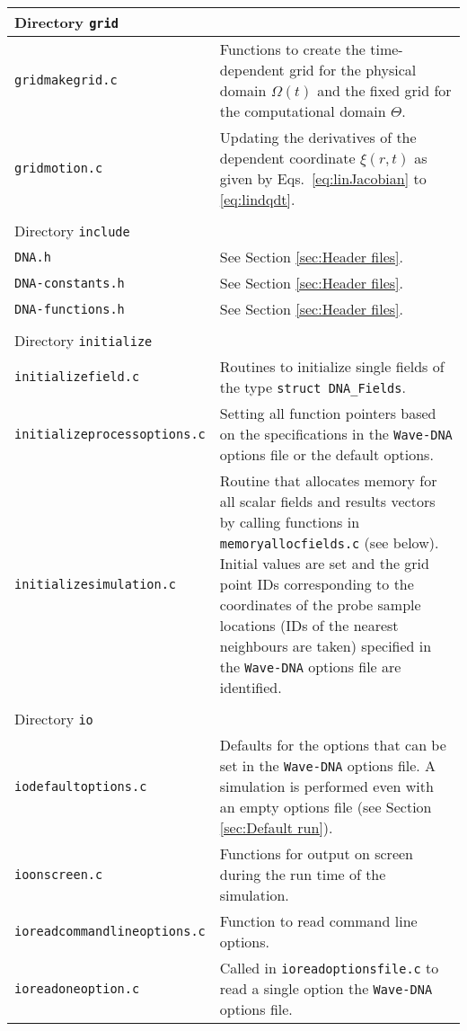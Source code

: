 \begin{longtable}{p{} p{}}
\\
\hline Directory {\tt grid} &\\ \hline
{\tt gridmakegrid.c} & Functions to create the time-dependent grid for the physical domain $\Omega\left(t\right)$ and the fixed grid for the computational domain $\Theta$. \\
{\tt gridmotion.c} & Updating the derivatives of the dependent coordinate $\xi\left(r,t\right)$ as given by Eqs.~\eqref{eq:linJacobian} to \eqref{eq:lindqdt}. \\
\\
\hline Directory {\tt include} &\\ \hline
{\tt DNA.h} & See Section \ref{sec:Header files}. \\
{\tt DNA-constants.h} & See Section \ref{sec:Header files}. \\
{\tt DNA-functions.h} & See Section \ref{sec:Header files}. \\
\\
\hline Directory {\tt initialize} &\\ \hline
{\tt initializefield.c} & Routines to initialize single fields of the type {\tt struct DNA\_Fields}. \\
{\tt initializeprocessoptions.c} & Setting all function pointers based on the specifications in the {\tt Wave-DNA} options file or the default options. \\
{\tt initializesimulation.c} & Routine that allocates memory for all scalar fields and results vectors by calling functions in {\tt memoryallocfields.c} (see below). Initial values are set and the grid point IDs corresponding to the coordinates of the probe sample locations (IDs of the nearest neighbours are taken) specified in the {\tt Wave-DNA} options file are identified. \\
\\
\hline Directory {\tt io} &\\ \hline
{\tt iodefaultoptions.c} & Defaults for the options that can be set in the {\tt Wave-DNA} options file. A simulation is performed even with an empty options file (see Section \ref{sec:Default run}). \\
{\tt ioonscreen.c} & Functions for output on screen during the run time of the simulation. \\
{\tt ioreadcommandlineoptions.c} & Function to read command line options. \\
{\tt ioreadoneoption.c} & Called in {\tt ioreadoptionsfile.c} to read a single option the {\tt Wave-DNA} options file. \\

\end{longtable}
